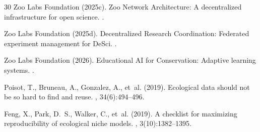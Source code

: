 \documentclass[11pt,a4paper]{article}
\begin{document}
\begin{thebibliography}{30}
Zoo Labs Foundation (2025c).
\newblock Zoo Network Architecture: A decentralized infrastructure for open science.
.

Zoo Labs Foundation (2025d).
\newblock Decentralized Research Coordination: Federated experiment management for DeSci.
.

Zoo Labs Foundation (2026).
\newblock Educational AI for Conservation: Adaptive learning systems.
.

Poisot, T., Bruneau, A., Gonzalez, A., et~al. (2019).
\newblock Ecological data should not be so hard to find and reuse.
, 34(6):494--496.

Feng, X., Park, D.~S., Walker, C., et~al. (2019).
\newblock A checklist for maximizing reproducibility of ecological niche models.
, 3(10):1382--1395.

\end{thebibliography}
\end{document}
